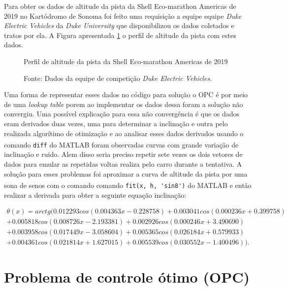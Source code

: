 Para obter os dados de altitude da pista da Shell Eco-marathon Americas de 2019 no Kartódromo de Sonoma foi feito uma requisição a equipe
equipe \textit{Duke Electric Vehicles} da \textit{Duke University} que disponibilizou os dados coletados e tratos por ela. A Figura apresentada \ref{fig:altitude_pista} 
o perfil de altitude da pista com estes dados.

\begin{figure}[h]
    \centering
    \caption{Perfil de altitude da pista da Shell Eco-marathon Americas de 2019}
    
    \label{fig:altitude_pista}
    \caption*{\footnotesize{Fonte: Dados da equipe de competição \textit{Duke Electric Vehicles}.}}
\end{figure}

Uma forma de representar esses dados no código para solução o OPC é por meio de uma \textit{lookup table} porem ao implementar os dados dessa foram
a solução não convergiu. Uma possível explicação para essa não convergência é que os dados eram derivados duas vezes, uma para determinar a inclinação e outra pelo 
realizada algorítimo de otimização e ao analisar esses dados derivados usando o comando \lstinline[style=Matlab-editor]{diff} do MATLAB\textsuperscript{\textregistered} foram observadas curvas
com grande variação de inclinação e ruido. Alem disso seria preciso repetir sete vezes os dois vetores de dados para emular as repetidas voltas realiza pelo carro durante a tentativa.
A solução para esses problemas foi aproximar a curva de altitude da pista por uma sona de senos com o comando comando \lstinline[style=Matlab-editor]{fit(x, h, 'sin8')} do MATLAB\textsuperscript{\textregistered} 
e então realizar a derivada para obter a seguinte equação inclinação:

\begin{multline}
    \label{eq:modeloTheta}
        \theta(x) = arctg(0.012293 cos(0.004363 x - 0.228758) 
        +0.003041 cos(0.000236 x + 0.399758) \\
        +0.005818 cos(0.008726 x - 2.193381) 
        +0.002926 cos(0.000246 x + 3.490690) \\
        +0.003958 cos(0.017449 x - 3.058604) 
        +0.005365 cos(0.026184 x + 0.579933) \\
        +0.004361 cos(0.021814 x + 1.627015) 
        +0.005539 cos(0.030552 x - 1.400496)).
\end{multline}

\section{Problema de controle ótimo (OPC)}



